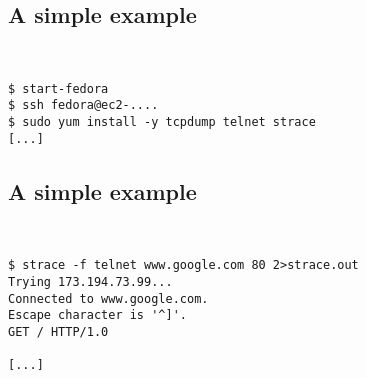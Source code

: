 \documentclass[xga]{xdvislides}
\begin{document}
\subsection{A simple example}
\\
\Hugesize
\begin{center}
\begin{verbatim}
$ start-fedora
$ ssh fedora@ec2-....
$ sudo yum install -y tcpdump telnet strace
[...]
\end{verbatim}
\end{center}
\Normalsize
\vspace*{\fill}

\subsection{A simple example}
\\
\Hugesize
\begin{center}
\begin{verbatim}
$ strace -f telnet www.google.com 80 2>strace.out
Trying 173.194.73.99...
Connected to www.google.com.
Escape character is '^]'.
GET / HTTP/1.0

[...]
\end{verbatim}
\end{center}
\Normalsize
\vspace*{\fill}

%
\end{document}
